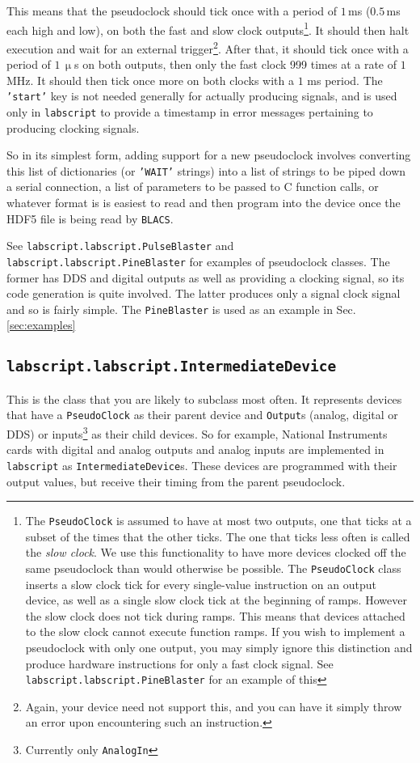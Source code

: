 \documentclass[a4paper,11pt,titlepage]{article}
\begin{document}

This means that the pseudoclock should tick once with a period of $1$\,ms ($0.5$\,ms each high and low), on both the fast and slow clock outputs\footnote{The \texttt{PseudoClock} is assumed to have at most two outputs, one that ticks at a subset of the times that the other ticks. The one that ticks less often is called the \emph{slow clock}. We use this functionality to have more devices clocked off the same pseudoclock than would otherwise be possible. The \texttt{PseudoClock} class inserts a slow clock tick for every single-value instruction on an output device, as well as a single slow clock tick at the beginning of ramps. However the slow clock does not tick during ramps. This means that devices attached to the slow clock cannot execute function ramps. If you wish to implement a pseudoclock with only one output, you may simply ignore this distinction and produce hardware instructions for only a fast clock signal. See \texttt{labscript.labscript.PineBlaster} for an example of this}. It should then halt execution and wait for an external trigger\footnote{Again, your device need not support this, and you can have it simply throw an error upon encountering such an instruction.}. After that, it should tick once with a period of $1\,\upmu$s on both outputs, then only the fast clock 999 times at a rate of $1$ MHz. It should then tick once more on both clocks with a $1$ ms period. The \texttt{'start'} key is not needed generally for actually producing signals, and is used only in \texttt{labscript} to provide a timestamp in error messages pertaining to producing clocking signals.

So in its simplest form, adding support for a new pseudoclock involves converting this list of dictionaries (or \texttt{'WAIT'} strings) into a list of strings to be piped down a serial connection, a list of parameters to be passed to C function calls, or whatever format is is easiest to read and then program into the device once the HDF5 file is being read by \texttt{BLACS}.

See \texttt{labscript.labscript.PulseBlaster} and \texttt{labscript.labscript.PineBlaster} for examples of pseudoclock classes. The former has DDS and digital outputs as well as providing a clocking signal, so its code generation is quite involved. The latter produces only a signal clock signal and so is fairly simple. The \texttt{PineBlaster} is used as an example in Sec. \ref{sec:examples}

\subsection{\texttt{labscript.labscript.IntermediateDevice}}
This is the class that you are likely to subclass most often. It represents devices that have a \texttt{PseudoClock} as their parent device and \texttt{Output}s (analog, digital or DDS) or inputs\footnote{Currently only \texttt{AnalogIn}} as their child devices. So for example, National Instruments cards with digital and analog outputs and analog inputs are implemented in \texttt{labscript} as \texttt{IntermediateDevice}s. These devices are programmed with their output values, but receive their timing from the parent pseudoclock.
\end{document}
